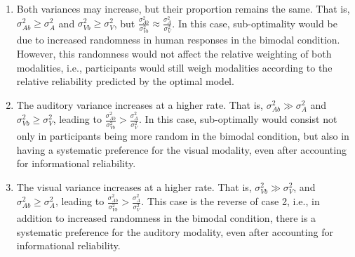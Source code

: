 \documentclass[english,man]{apa6}
\theoremstyle{definition}
\theoremstyle{definition}
\theoremstyle{definition}
\theoremstyle{remark}
\begin{document}
\begin{enumerate}
\def\labelenumi{\arabic{enumi})}
\item
  Both variances may increase, but their proportion remains the same.
  That is, \(\sigma^2_{Ab} \geqslant \sigma^2_{A}\) and
  \(\sigma^2_{Vb} \geqslant \sigma^2_{V}\), but
  \(\frac{\sigma^2_{Ab}}{\sigma^2_{Vb}} \approx \frac{\sigma^2_{A}}{\sigma^2_{V}}\).
  In this case, sub-optimality would be due to increased randomness in
  human responses in the bimodal condition. However, this randomness
  would not affect the relative weighting of both modalities, i.e.,
  participants would still weigh modalities according to the relative
  reliability predicted by the optimal model.
\item
  The auditory variance increases at a higher rate. That is,
  \(\sigma^2_{Ab} \gg \sigma^2_{A}\) and
  \(\sigma^2_{Vb} \geqslant \sigma^2_{V}\), leading to
  \(\frac{\sigma^2_{Ab}}{\sigma^2_{Vb}} > \frac{\sigma^2_{A}}{\sigma^2_{V}}\).
  In this case, sub-optimally would consist not only in participants
  being more random in the bimodal condition, but also in having a
  systematic preference for the visual modality, even after accounting
  for informational reliability.
\item
  The visual variance increases at a higher rate. That is,
  \(\sigma^2_{Vb} \gg \sigma^2_{V}\), and
  \(\sigma^2_{Ab} \geqslant \sigma^2_{A}\), leading to
  \(\frac{\sigma^2_{Ab}}{\sigma^2_{Vb}} > \frac{\sigma^2_{A}}{\sigma^2_{V}}\).
  This case is the reverse of case 2, i.e., in addition to increased
  randomness in the bimodal condition, there is a systematic preference
  for the auditory modality, even after accounting for informational
  reliability.
\end{enumerate}
\end{document}
